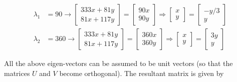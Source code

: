 \begin{align}
    \lambda_1 &= 90 \rightarrow \begin{bmatrix}
        333x + 81y \\
        81x + 117y
        \end{bmatrix} = \begin{bmatrix}
        90 x \\ 90 y
        \end{bmatrix} \Rightarrow
        \begin{bmatrix}
        x \\ y
        \end{bmatrix} = \begin{bmatrix}
        -y/3 \\ y
        \end{bmatrix}
    \nonumber \\
    \lambda_2 &= 360 \rightarrow \begin{bmatrix}
        333x + 81y \\
        81x + 117y
        \end{bmatrix} = \begin{bmatrix}
        360 x \\ 360 y
        \end{bmatrix} \Rightarrow
        \begin{bmatrix}
        x \\ y
        \end{bmatrix} = \begin{bmatrix}
        3y \\ y
        \end{bmatrix}
    \nonumber
\end{align}

All the above eigen-vectors can be assumed to be unit vectors (so that the matrices $U$ and $V$ become orthogonal). The resultant matrix is given by

